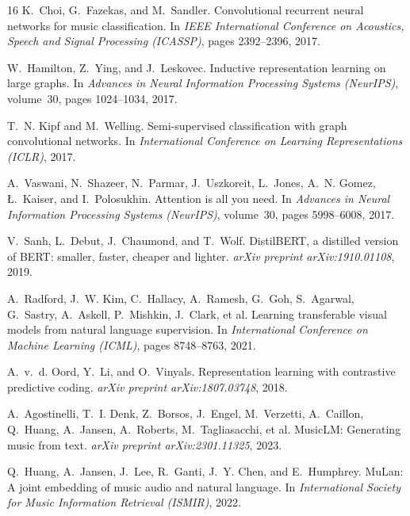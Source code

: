 \documentclass{article}
\begin{document}
\begin{thebibliography}{16}
\fontsize{8pt}{9.5pt}\selectfont
\setlength{\itemsep}{0pt}
\setlength{\parskip}{0pt}
K.~Choi, G.~Fazekas, and M.~Sandler.
\newblock Convolutional recurrent neural networks for music classification.
\newblock In \emph{IEEE International Conference on Acoustics, Speech and Signal Processing (ICASSP)}, pages 2392--2396, 2017.

W.~Hamilton, Z.~Ying, and J.~Leskovec.
\newblock Inductive representation learning on large graphs.
\newblock In \emph{Advances in Neural Information Processing Systems (NeurIPS)}, volume~30, pages 1024--1034, 2017.

T.~N. Kipf and M.~Welling.
\newblock Semi-supervised classification with graph convolutional networks.
\newblock In \emph{International Conference on Learning Representations (ICLR)}, 2017.

A.~Vaswani, N.~Shazeer, N.~Parmar, J.~Uszkoreit, L.~Jones, A.~N. Gomez, {\L}.~Kaiser, and I.~Polosukhin.
\newblock Attention is all you need.
\newblock In \emph{Advances in Neural Information Processing Systems (NeurIPS)}, volume~30, pages 5998--6008, 2017.

V.~Sanh, L.~Debut, J.~Chaumond, and T.~Wolf.
\newblock DistilBERT, a distilled version of BERT: smaller, faster, cheaper and lighter.
\newblock \emph{arXiv preprint arXiv:1910.01108}, 2019.

A.~Radford, J.~W. Kim, C.~Hallacy, A.~Ramesh, G.~Goh, S.~Agarwal, G.~Sastry, A.~Askell, P.~Mishkin, J.~Clark, et al.
\newblock Learning transferable visual models from natural language supervision.
\newblock In \emph{International Conference on Machine Learning (ICML)}, pages 8748--8763, 2021.

A.~v.~d. Oord, Y.~Li, and O.~Vinyals.
\newblock Representation learning with contrastive predictive coding.
\newblock \emph{arXiv preprint arXiv:1807.03748}, 2018.

A.~Agostinelli, T.~I. Denk, Z.~Borsos, J.~Engel, M.~Verzetti, A.~Caillon, Q.~Huang, A.~Jansen, A.~Roberts, M.~Tagliasacchi, et al.
\newblock MusicLM: Generating music from text.
\newblock \emph{arXiv preprint arXiv:2301.11325}, 2023.

Q.~Huang, A.~Jansen, J.~Lee, R.~Ganti, J.~Y. Chen, and E.~Humphrey.
\newblock MuLan: A joint embedding of music audio and natural language.
\newblock In \emph{International Society for Music Information Retrieval (ISMIR)}, 2022.


\end{thebibliography}
\end{document}

